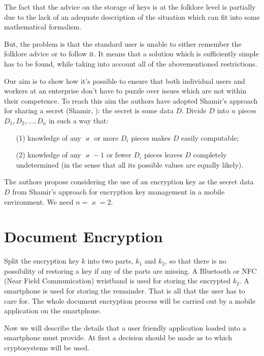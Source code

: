 \documentclass{bjmc}
\begin{document}
The fact that the advice on the storage of keys is at the folklore level is partially due to the lack of an adequate description of the situation which can fit into some mathematical formalism.

But, the problem is that the standard user is unable to either remember the folklore advice or to follow it. It means that a solution which is sufficiently simple has to be found, while taking into
 account all of the abovementioned restrictions. 

Our aim is to show how it's possible to ensure that both individual users and workers at an enterprise don't have to puzzle over issues which are not within their competence.
To reach this aim the authors have adopted Shamir's approach for sharing a secret (Shamir, \cite{Sha}): the secret is some data $D$. 
Divide $D$ into $n$ pieces $D_1, D_2, \ldots , D_n$
in such a way that:
\begin{itemize}
\item[(1)] knowledge of any $\varkappa$ or more $D_i$ pieces makes $D$ easily computable;
\item[(2)] knowledge of any $\varkappa-1$ or fewer $D_i$ pieces leaves $D$ completely undetermined (in the sense that all its possible values
are equally likely).
\end{itemize}
The authors propose considering the use of an encryption key as the secret data $D$ from Shamir's approach for encryption key management in a mobile environment.
We need $n=\varkappa=2$.

\section{Document Encryption} 

Split the encryption key $k$ into two parts, $k_1$ and $k_2$, so that there is no possibility of restoring a key if any of the parts are missing. 
A Bluetooth or NFC (Near Field Communication) wristband is used for storing the encrypted $k_2$. A smartphone is used for storing the remainder. That is all that the user has to care for. 
The whole document encryption process will be carried out by a mobile application on the smartphone.

Now we will describe the details that a user friendly application loaded into a smartphone must provide. 
At first a decision should be made as to which cryptosystems will be used. 
\end{document}
